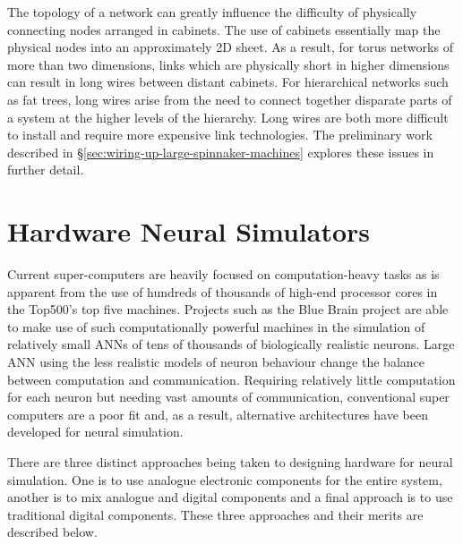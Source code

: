			The topology of a network can greatly influence the difficulty of
			physically connecting nodes arranged in cabinets. The use of cabinets
			essentially map the physical nodes into an approximately 2D sheet. As a
			result, for torus networks of more than two dimensions, links which are
			physically short in higher dimensions can result in long wires between
			distant cabinets. For hierarchical networks such as fat trees, long wires
			arise from the need to connect together disparate parts of a system at the
			higher levels of the hierarchy. Long wires are both more difficult to
			install and require more expensive link technologies. The preliminary work
			described in \S\ref{sec:wiring-up-large-spinnaker-machines} explores these
			issues in further detail.
			
			
	
	\section{Hardware Neural Simulators}
		
		
		Current super-computers are heavily focused on computation-heavy tasks as is
		apparent from the use of hundreds of thousands of high-end processor cores
		in the Top500's top five machines. Projects such as the Blue Brain project
		\cite{markram06} are able to make use of such computationally powerful
		machines in the simulation of relatively small ANNs of tens of thousands of
		biologically realistic neurons. Large ANN using the less realistic models of
		neuron behaviour change the balance between computation and communication.
		Requiring relatively little computation for each neuron but needing vast
		amounts of communication, conventional super computers are a poor fit and,
		as a result, alternative architectures have been developed for neural
		simulation.
		
		There are three distinct approaches being taken to designing hardware for
		neural simulation. One is to use analogue electronic components for the
		entire system, another is to mix analogue and digital components and a final
		approach is to use traditional digital components. These three approaches
		and their merits are described below.
		
